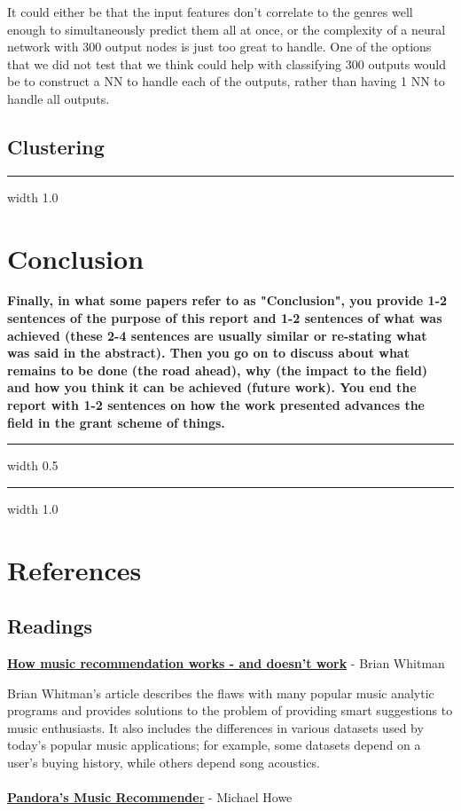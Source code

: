 \documentclass[12pt]{article}
\newcommand{\horizontalLine}{
	\begin{center}
		\hrule width 1.0\textwidth
	\end{center}
}
\newcommand{\smallHorizontalLine}{
    \begin{center}
        \hrule width 0.5\textwidth
    \end{center}}
\begin{document}
It could either be that the input features don't correlate to the genres well enough to simultaneously predict them all at once, or the complexity of a neural network with 300 output nodes is just too great to handle. One of the options that we did not test that we think could help with classifying 300 outputs would be to construct a NN to handle each of the outputs, rather than having 1 NN to handle all outputs. 

\subsection{Clustering}
\label{subsec:clusteringDisc}

\horizontalLine
\section{Conclusion}
\label{sec:conclusion}
\textbf{Finally, in what some papers refer to as "Conclusion", you provide 1-2 sentences of the purpose
of this report and 1-2 sentences of what was achieved (these 2-4 sentences are usually similar
or re-stating what was said in the abstract). Then you go on to discuss about what remains to
be done (the road ahead), why (the impact to the field) and how you think it can be achieved
(future work). You end the report with 1-2 sentences on how the work presented advances the
field in the grant scheme of things.}
\smallHorizontalLine

\horizontalLine
\section{References}
\label{sec:references}

\subsection{Readings}
\label{subsec:readings}
\href{http://notes.variogr.am/post/37675885491/how-music-recommendation-works-and-doesnt-work}{\textbf{How music recommendation works - and doesn't work}} - Brian Whitman

Brian Whitman's article describes the flaws with many popular music analytic programs and provides solutions to the problem of providing smart suggestions to music enthusiasts. It also includes the differences in various datasets used by today's popular music applications; for example, some datasets depend on a user's buying history, while others depend song acoustics.
\\
\\
\href{http://courses.cs.washington.edu/courses/csep521/07wi/prj/michael.pdf}{\textbf{Pandora's Music Recommende}r} - Michael Howe 
\end{document}
